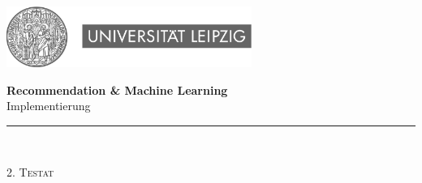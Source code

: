 

\begin{titlepage}
\begin{center}





\begin{flushright}
\includegraphics[width=0.6\textwidth]{img/unileipziglogo.jpg}\\[5cm]
\end{flushright}



\newcommand{\HRule}{\rule{\linewidth}{0.5mm}}
{\huge \bfseries Recommendation \& Machine Learning}\\[0.5cm]
{\Large Implementierung}\\
\HRule \\[2.5cm]

\begin{flushleft}
\textsc{\Large 2. Testat }\\[0.25cm]
\end{flushleft}

\begin{minipage}[t]{.7\textwidth}%
\end{minipage}%
\begin{minipage}[t]{.3\textwidth}%
\begin{flushright}
  \end{flushright}
\end{minipage}\\[3.5cm]


\vfill %


\end{center}
\end{titlepage}
